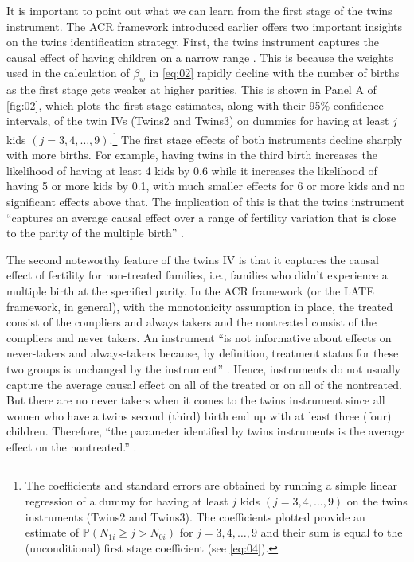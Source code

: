 It is important to point out what we can learn from the first stage of the twins instrument. The ACR framework introduced earlier offers two important insights on the twins identification strategy. First, the twins instrument captures the causal effect of having children on a narrow range \parencite{angrist_multiple_2010}. This is because the weights used in the calculation of $ \beta_{w} $ in \eqref{eq:02} rapidly decline with the number of births as the first stage gets weaker at higher parities. This is shown in Panel A of \autoref{fig:02}, which plots the first stage estimates, along with their 95\% confidence intervals, of the twin IVs (Twins2 and Twins3) on dummies for having at least $ j $ kids $ (j = 3, 4, \dots, 9) $.\footnote{ The coefficients and standard errors are obtained by running a simple linear regression of a dummy for having at least $ j $ kids $ (j = 3, 4, \dots, 9) $ on the twins instruments (Twins2 and Twins3). The coefficients plotted provide an estimate of $ \mathbb{P}(N_{1i} \geq j > N_{0i}) $ for $ j = 3, 4, \dots, 9 $ and their sum is equal to the (unconditional) first stage coefficient (see \eqref{eq:04}). } The first stage effects of both instruments decline sharply with more births. For example, having twins in the third birth increases the likelihood of having at least 4 kids by 0.6 while it increases the likelihood of having 5 or more kids by 0.1, with much smaller effects for 6 or more kids and no significant effects above that.  The implication of this is that the twins instrument \enquote{captures an average causal effect over a range of fertility variation that is close to the parity of the multiple birth} \parencite[p.~788]{angrist_multiple_2010}. 

The second noteworthy feature of the twins IV is that it captures the causal effect of fertility for non-treated families, i.e., families who didn't experience a multiple birth at the specified parity. In the ACR framework (or the LATE framework, in general), with the monotonicity assumption in place, the treated consist of the compliers and always takers and the nontreated consist of the compliers and never takers. An instrument \enquote{is not informative about effects on never-takers and always-takers because, by definition, treatment status for these two groups is unchanged by the instrument} \parencite[p.~158]{Angrist2009}. Hence, instruments do not usually capture the average causal effect on all of the treated or on all of the nontreated. But there are no never takers when it comes to the twins instrument since all women who have a twins second (third) birth end up with at least three (four) children. Therefore, \enquote{the parameter identified by twins instruments is the average effect on the nontreated.} \parencite[p.~788]{angrist_multiple_2010}.












